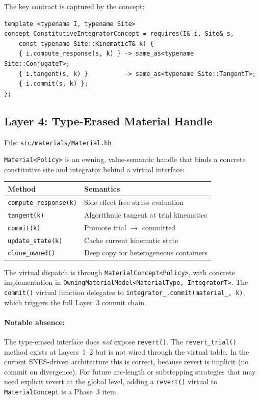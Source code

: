 The key contract is captured by the concept:

\begin{verbatim}
template <typename I, typename Site>
concept ConstitutiveIntegratorConcept = requires(I& i, Site& s,
    const typename Site::KinematicT& k) {
    { i.compute_response(s, k) } -> same_as<typename Site::ConjugateT>;
    { i.tangent(s, k) }          -> same_as<typename Site::TangentT>;
    { i.commit(s, k) };
};
\end{verbatim}

\subsection{Layer 4: Type-Erased Material Handle}
\label{sec:layer4-material}

File: \texttt{src/materials/Material.hh}

\texttt{Material<Policy>} is an owning, value-semantic handle that
binds a concrete constitutive site and integrator behind a virtual
interface:

\begin{center}
\begin{tabular}{ll}
\toprule
\textbf{Method} & \textbf{Semantics} \\
\midrule
\texttt{compute\_response(k)} & Side-effect free stress evaluation \\
\texttt{tangent(k)}           & Algorithmic tangent at trial kinematics \\
\texttt{commit(k)}            & Promote trial $\to$ committed \\
\texttt{update\_state(k)}     & Cache current kinematic state \\
\texttt{clone\_owned()}       & Deep copy for heterogeneous containers \\
\bottomrule
\end{tabular}
\end{center}

The virtual dispatch is through \texttt{MaterialConcept<Policy>}, with
concrete implementation in \texttt{OwningMaterialModel<MaterialType,
IntegratorT>}.  The \texttt{commit()} virtual function delegates to
\texttt{integrator\_.commit(material\_, k)}, which triggers the full
Layer~3 commit chain.

\paragraph{Notable absence:}
The type-erased interface does \emph{not} expose \texttt{revert()}.
The \texttt{revert\_trial()} method exists at Layers~1--2 but is not
wired through the virtual table.  In the current SNES-driven
architecture this is correct, because revert is implicit (no
commit on divergence).  For future arc-length or substepping
strategies that may need explicit revert at the global level,
adding a \texttt{revert()} virtual to \texttt{MaterialConcept}
is a Phase~3 item.

